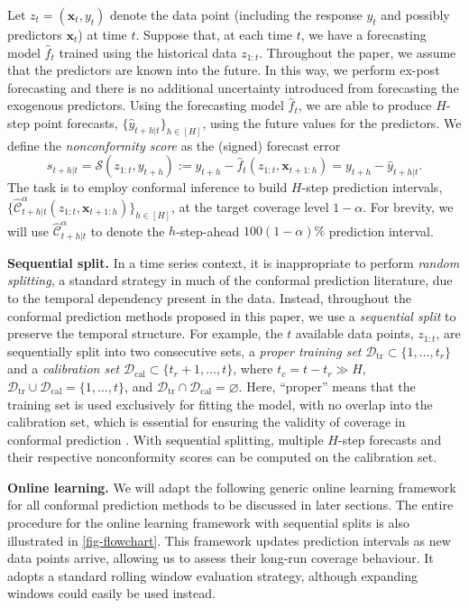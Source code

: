 \documentclass[
  11pt,
  12pt]{article}
\theoremstyle{plain}
\theoremstyle{remark}
\begin{document}
Let \(z_t = (\bm{x}_t, y_t)\) denote the data point (including the
response \(y_t\) and possibly predictors \(\bm{x}_t\)) at time \(t\).
Suppose that, at each time \(t\), we have a forecasting model
\(\hat{f}_t\) trained using the historical data \(z_{1:t}\). Throughout
the paper, we assume that the predictors are known into the future. In
this way, we perform ex-post forecasting and there is no additional
uncertainty introduced from forecasting the exogenous predictors. Using
the forecasting model \(\hat{f}_t\), we are able to produce \(H\)-step
point forecasts, \(\{\hat{y}_{t+h|t}\}_{h\in[H]}\), using the future
values for the predictors. We define the \emph{nonconformity score} as
the (signed) forecast error \[
s_{t+h|t}=\mathcal{S}(z_{1:t}, y_{t+h}):=y_{t+h}-\hat{f}_t(z_{1:t},\bm{x}_{t+1:h})=y_{t+h}-\hat{y}_{t+h|t}.
\] The task is to employ conformal inference to build \(H\)-step
prediction intervals,
\(\{\hat{\mathcal{C}}_{t+h|t}^{\alpha}(z_{1:t},\bm{x}_{t+1:h})\}_{h\in[H]}\),
at the target coverage level \(1-\alpha\). For brevity, we will use
\(\hat{\mathcal{C}}_{t+h|t}^{\alpha}\) to denote the \(h\)-step-ahead
\(100(1-\alpha)\%\) prediction interval.

\textbf{Sequential split.} In a time series context, it is inappropriate
to perform \emph{random splitting}, a standard strategy in much of the
conformal prediction literature, due to the temporal dependency present
in the data. Instead, throughout the conformal prediction methods
proposed in this paper, we use a \emph{sequential split} to preserve the
temporal structure. For example, the \(t\) available data points,
\(z_{1:t}\), are sequentially split into two consecutive sets, a
\emph{proper training set}
\(\mathcal{D}_{\text{tr}} \subset \{1,\ldots,t_r\}\) and a
\emph{calibration set}
\(\mathcal{D}_{\text{cal}} \subset \{t_r+1,\ldots,t\}\), where
\(t_c=t-t_r \gg H\),
\(\mathcal{D}_{\text{tr}} \cup \mathcal{D}_{\text{cal}} = \{1, \ldots, t\}\),
and
\(\mathcal{D}_{\text{tr}} \cap \mathcal{D}_{\text{cal}} = \varnothing\).
Here, ``proper'' means that the training set is used exclusively for
fitting the model, with no overlap into the calibration set, which is
essential for ensuring the validity of coverage in conformal prediction
\citep{papadopoulos2007}. With sequential splitting, multiple \(H\)-step
forecasts and their respective nonconformity scores can be computed on
the calibration set.

\textbf{Online learning.} We will adapt the following generic online
learning framework for all conformal prediction methods to be discussed
in later sections. The entire procedure for the online learning
framework with sequential splits is also illustrated in
\autoref{fig-flowchart}. This framework updates prediction intervals as
new data points arrive, allowing us to assess their long-run coverage
behaviour. It adopts a standard rolling window evaluation strategy,
although expanding windows could easily be used instead.
\end{document}
